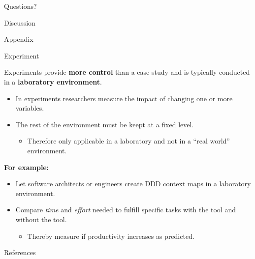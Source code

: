 \documentclass[10pt]{beamer}
\begin{document}
\begin{frame}[standout]
  Questions?
\end{frame}

\begin{frame}[standout]
  Discussion
\end{frame}

\appendix

\begin{frame}[standout]
  Appendix
\end{frame}

\begin{frame}{Experiment}
	
	Experiments provide \textbf{more control} than a case study and is typically conducted in a \textbf{laboratory environment}.
	
	\begin{itemize}
		\item In experiments researchers measure the impact of changing one or more variables.
		\item The rest of the environment must be keept at a fixed level.
		\begin{itemize}
			\item Therefore only applicable in a laboratory and not in a ``real world'' environment.
		\end{itemize}
	\end{itemize}
	
	\bigskip
	\textbf{For example:}
	\begin{itemize}
		\item Let software architects or engineers create DDD context maps in a laboratory environment.
		\item Compare \textit{time} and \textit{effort} needed to fulfill specific tasks with the tool and without the tool.
		\begin{itemize}
			\item Thereby measure if productivity increases as predicted.
		\end{itemize}
	\end{itemize}		
	
\end{frame}

\begin{frame}[allowframebreaks]{References}

  
  

\end{frame}
\end{document}
